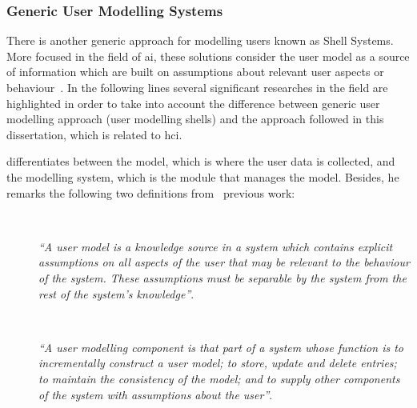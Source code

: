
\subsubsection{Generic User Modelling Systems}
\label{sec:generic_users}

There is another generic approach for modelling users known as Shell Systems. 
More focused in the field of \ac{ai}, these solutions consider the user model as 
a source of information which are built on assumptions about relevant user aspects 
or behaviour~\citep{pohl_logic_based_1999}. In the following lines several 
significant researches in the field are highlighted in order to take into account
the difference between generic user modelling approach (user modelling shells) and
the approach followed in this dissertation, which is related to \ac{hci}.

\citet{heckmann_ubiquitous_2005} differentiates between the model, which is where 
the user data is collected, and the modelling system, which is the module that
manages the model. Besides, he remarks the following two definitions
from~\citet{wahlster1989user} previous work:

\begin{description}
  \item[] \hfill \\
  \begin{mdframed}[hidealllines=true,backgroundcolor=gray!20]
  \textit{``A user model is a knowledge source in a system which contains explicit
  assumptions on all aspects of the user that may be relevant to the behaviour
  of the system. These assumptions must be separable by the system from the
  rest of the system's knowledge''}.
  \end{mdframed}

  \item[] \hfill \\
  \begin{mdframed}[hidealllines=true,backgroundcolor=gray!20]
  \textit{``A user modelling component is that part of a system whose function is to
  incrementally construct a user model; to store, update and delete entries;
  to maintain the consistency of the model; and to supply other components of
  the system with assumptions about the user''}.
  \end{mdframed}
  
\end{description}


